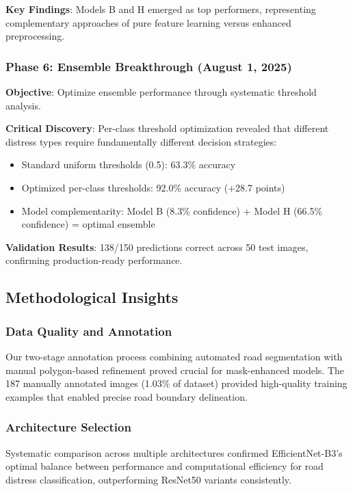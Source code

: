\documentclass[12pt]{article}
\begin{document}
\textbf{Key Findings}: Models B and H emerged as top performers, representing complementary approaches of pure feature learning versus enhanced preprocessing.

\subsubsection{Phase 6: Ensemble Breakthrough (August 1, 2025)}

\textbf{Objective}: Optimize ensemble performance through systematic threshold analysis.

\textbf{Critical Discovery}: Per-class threshold optimization revealed that different distress types require fundamentally different decision strategies:

\begin{itemize}[itemsep=1pt,parsep=0pt,topsep=2pt]
\item Standard uniform thresholds (0.5): 63.3\% accuracy
\item Optimized per-class thresholds: 92.0\% accuracy (+28.7 points)
\item Model complementarity: Model B (8.3\% confidence) + Model H (66.5\% confidence) = optimal ensemble
\end{itemize}

\textbf{Validation Results}: 138/150 predictions correct across 50 test images, confirming production-ready performance.

\subsection{Methodological Insights}

\subsubsection{Data Quality and Annotation}

Our two-stage annotation process combining automated road segmentation with manual polygon-based refinement proved crucial for mask-enhanced models. The 187 manually annotated images (1.03\% of dataset) provided high-quality training examples that enabled precise road boundary delineation.

\subsubsection{Architecture Selection}

Systematic comparison across multiple architectures confirmed EfficientNet-B3's optimal balance between performance and computational efficiency for road distress classification, outperforming ResNet50 variants consistently.
\end{document}
